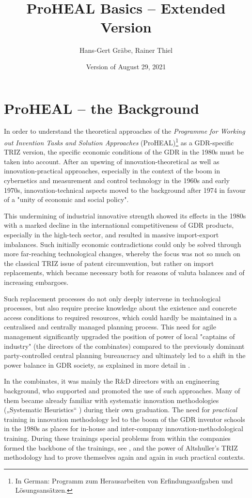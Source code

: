 \documentclass[11pt,a4paper]{article}
\title{ProHEAL Basics -- Extended Version}
\author{Hans-Gert Gr\"abe, Rainer Thiel}
\date{Version of August 29, 2021}
\begin{document}
\maketitle

\section{ProHEAL -- the Background}

In order to understand the theoretical approaches of the \emph{Programme for
  Working out Invention Tasks and Solution Approaches} (ProHEAL)\footnote{In
  German: Programm zum Herausarbeiten von Erfindungsaufgaben und
  Lösungsansätzen. } as a GDR-specific TRIZ version, the specific economic
conditions of the GDR in the 1980s must be taken into account. After an
upswing of innovation-theoretical as well as innovation-practical approaches,
especially in the context of the boom in cybernetics and measurement and
control technology in the 1960s and early 1970s, innovation-technical aspects
moved to the background after 1974 in favour of a "unity of economic and
social policy".

This undermining of industrial innovative strength showed its effects in the
1980s with a marked decline in the international competitiveness of GDR
products, especially in the high-tech sector, and resulted in massive
import-export imbalances. Such initially economic contradictions could only be
solved through more far-reaching technological changes, whereby the focus was
not so much on the classical TRIZ issue of patent circumvention, but rather on
import replacements, which became necessary both for reasons of valuta
balances and of increasing embargoes.

Such replacement processes do not only deeply intervene in technological
processes, but also require precise knowledge about the existence and concrete
access conditions to required resources, which could hardly be maintained in a
centralised and centrally managed planning process. This need for agile
management significantly upgraded the position of power of local "captains of
industry" (the directors of the combinates) compared to the previously
dominant party-controlled central planning bureaucracy and ultimately led to a
shift in the power balance in GDR society, as explained in more detail in
\cite{Barkleit}.

In the combinates, it was mainly the R\&D directors with an engineering
background, who supported and promoted the use of such approaches.  Many of
them became already familiar with systematic innovation methodologies
(„Systematic Heuristics“ \cite{RM-23}) during their own graduation. The need
for \emph{practical} training in innovation methodology led to the boom of the
GDR inventor schools in the 1980s as places for in-house and inter-company
innovation-methodological training.  During these trainings special problems
from within the companies formed the backbone of the trainings, see \cite[part
  1, ch. 3]{RT94}, and the power of Altshuller's TRIZ methodology had to prove
themselves again and again in such practical contexts.
\end{document}
